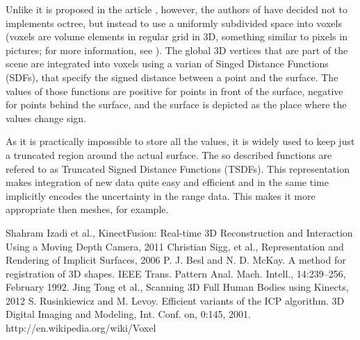 \documentclass[12pt]{article}
\theoremstyle{plain}
\begin{document}
    Unlike it is proposed in the article
    \cite{representaion-and-rendering-of-implicit-surfaces}, however, the
    authors of \cite{kinectfusion} have decided not to implements octree, but
    instead to use a uniformly subdivided space into voxels (voxels are
    volume elements in regular grid in 3D, something similar to pixels in
    pictures; for more information, see \cite{voxel}). The global 3D vertices
    that are part of the scene are integrated into voxels using a varian of
    Singed Distance Functions (SDFs), that specify the signed distance between a
    point and the surface. The values of those functions are positive for points
    in front of the surface, negative for points behind the surface, and the
    surface is depicted as the place where the values change sign. 

    As it is practically impossible to store all the values, it is widely used
    to keep just a truncated region around the actual surface. The so described
    functions are refered to as Truncated Signed Distance Functions (TSDFs).
    This representation makes integration of new data quite easy and efficient
    and in the same time implicitly encodes the uncertainty in the range data.
    This makes it more appropriate then meshes, for example.

\begin{thebibliography}{widest entry}
   Shahram Izadi et al., KinectFusion: Real-time 3D
    Reconstruction and Interaction Using a Moving Depth Camera, 2011
   Christian Sigg, et
    al., Representation and Rendering of Implicit Surfaces, 2006
   P. J. Besl and N. D. McKay. A method for registration of 3D
    shapes. IEEE Trans. Pattern Anal. Mach. Intell., 14:239–256, February 1992. 
   Jing Tong et al., Scanning 3D Full Human Bodies using
    Kinects, 2012
   S. Rusinkiewicz and M. Levoy. Efficient variants of the
    ICP algorithm. 3D Digital Imaging and Modeling, Int.
    Conf. on, 0:145, 2001.
   http://en.wikipedia.org/wiki/Voxel
\end{thebibliography}

\hfill\\
\end{document}

